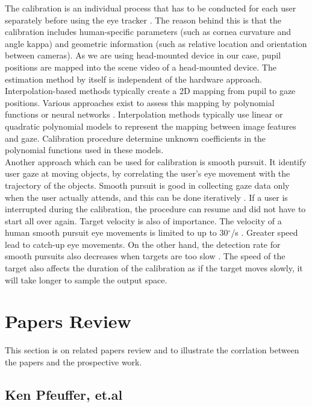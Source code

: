 The calibration is an individual process that has to be conducted for each user separately before using the eye tracker \cite{13}. The reason behind this is that the calibration includes human-specific parameters (such as cornea curvature and angle kappa) and geometric information (such as relative location and orientation between cameras). As we are using head-mounted device in our case, pupil positions are mapped into the scene video of a head-mounted device. The estimation method by itself is independent of the hardware approach. Interpolation-based methods typically create a 2D mapping from pupil to gaze positions. Various approaches exist to assess this mapping by polynomial functions \cite{26} or neural networks \cite{27}. Interpolation methods typically use linear or quadratic polynomial models to represent the mapping between image features and gaze. Calibration procedure determine unknown coefficients in the polynomial functions used in these models.\\

Another approach which can be used for calibration is smooth pursuit. It identify user gaze at moving objects, by correlating the user’s eye movement with the trajectory of the objects. Smooth pursuit is good in collecting gaze data only when the user actually attends, and this can be done iteratively \cite{4}. If a user is interrupted during the calibration, the procedure can resume and did not have to start all over again. Target velocity is also of importance. The velocity of a human smooth pursuit eye movements is limited to up to 30$^{\circ}$/s \cite{5}. Greater speed lead to catch-up eye movements. On the other hand, the detection rate for smooth pursuits also decreases when targets are too slow \cite{6}. The speed of the target also affects the duration of the calibration as if the target moves slowly, it will take longer to sample the output space. \\


\newpage

\section{Papers Review}

This section is on related papers review and to illustrate the corrlation between the papers and the prospective work.

\subsection{Ken Pfeuffer, et.al \cite{4}}


